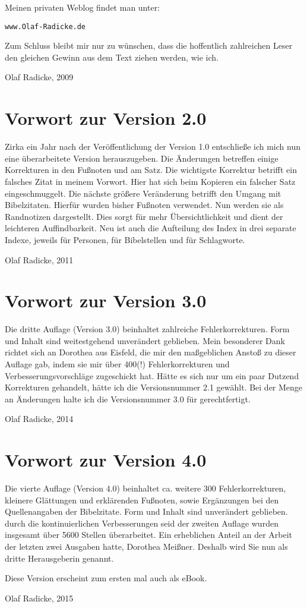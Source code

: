 Meinen privaten Weblog findet man unter:

\begin{center}
\texttt{www.Olaf-Radicke.de}
\end{center}

Zum Schluss bleibt mir nur zu wünschen, dass die hoffentlich zahlreichen Leser
den gleichen Gewinn aus dem Text ziehen werden, wie ich.

Olaf Radicke, 2009


\chapter{Vorwort zur Version 2.0}

Zirka ein Jahr nach der Veröffentlichung der Version 1.0 entschließe ich mich
nun eine überarbeitete Version herauszugeben. Die Änderungen betreffen einige
Korrekturen in den Fußnoten und am Satz. Die wichtigste Korrektur betrifft ein
falsches Zitat in meinem Vorwort. Hier hat sich beim Kopieren ein falscher Satz
eingeschmuggelt. Die nächste größere Veränderung betrifft den Umgang mit
Bibelzitaten. Hierfür wurden bisher Fußnoten verwendet. Nun werden sie als
Randnotizen dargestellt. Dies sorgt für mehr Übersichtlichkeit
und dient der leichteren Auffindbarkeit. Neu ist auch die Aufteilung des Index in
drei separate Indexe, jeweils für Personen, für Bibelstellen und für Schlagworte.

Olaf Radicke, 2011


\chapter{Vorwort zur Version 3.0}

Die dritte Auflage (Version 3.0) beinhaltet zahlreiche Fehlerkorrekturen.
Form und Inhalt sind weitestgehend unverändert geblieben. Mein besonderer Dank
richtet sich an Dorothea aus Eisfeld, die mir den maßgeblichen Anstoß zu dieser
Auflage gab, indem sie mir über 400(!) Fehlerkorrekturen und Verbesserungsvorschläge
zugeschickt hat. Hätte es sich nur um ein paar Dutzend Korrekturen gehandelt,
hätte ich die Versionsnummer 2.1 gewählt. Bei der Menge an Änderungen halte
ich die Versionsnummer 3.0 für gerechtfertigt.

Olaf Radicke, 2014


\chapter{Vorwort zur Version 4.0}

Die vierte Auflage (Version 4.0) beinhaltet ca. weitere 300 Fehlerkorrekturen,
kleinere Glättungen und erklärenden Fußnoten, sowie Ergänzungen bei den Quellenangaben
der Bibelzitate. Form und Inhalt sind unverändert geblieben. durch die kontinuierlichen
Verbesserungen seid der zweiten Auflage wurden insgesamt über 5600 Stellen überarbeitet.
Ein erheblichen Anteil an der Arbeit der letzten zwei Ausgaben hatte, Dorothea Meißner.
Deshalb wird Sie nun als dritte Herausgeberin genannt.


Diese Version
erscheint zum ersten mal auch als eBook.

Olaf Radicke, 2015